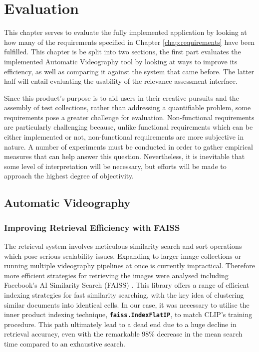 \documentclass{l4proj}
\begin{document}




\chapter{Evaluation} 
This chapter serves to evaluate the fully implemented application by looking at how many of the requirements specified in Chapter \ref{chap:requirements} have been fulfilled. This chapter is be split into two sections, the first part evaluates the implemented Automatic Videography tool by looking at ways to improve its efficiency, as well as comparing it against the system that came before. The latter half will entail evaluating the usability of the relevance assessment interface.

Since this product's purpose is to aid users in their creative pursuits and the assembly of test collections, rather than addressing a quantifiable problem, some requirements pose a greater challenge for evaluation. Non-functional requirements are particularly challenging because, unlike functional requirements which can be either implemented or not, non-functional requirements are more subjective in nature. A number of experiments must be conducted in order to gather empirical measures that can help answer this question. Nevertheless, it is inevitable that some level of interpretation will be necessary, but efforts will be made to approach the highest degree of objectivity.

\section{Automatic Videography}
\subsection{Improving Retrieval Efficiency with FAISS}
The retrieval system involves meticulous similarity search and sort operations which pose serious scalability issues. Expanding to larger image collections or running multiple videography pipelines at once is currently impractical. Therefore more efficient strategies for retrieving the images were analysed including Facebook's AI Similarity Search (FAISS) \citep{johnson2019faiss}. This library offers a range of efficient indexing strategies for fast similarity searching, with the key idea of clustering similar documents into identical cells. In our case, it was necessary to utilise the inner product indexing technique, \textbf{\lstinline|faiss.IndexFlatIP|}, to match CLIP's training procedure. This path ultimately lead to a dead end due to a huge decline in retrieval accuracy, even with the remarkable 98\% decrease in the mean search time compared to an exhaustive search. 
\end{document}
